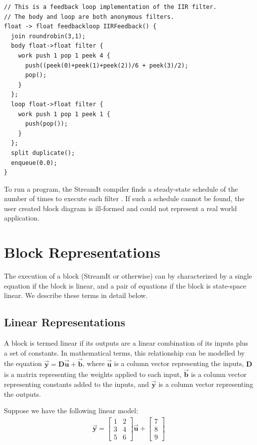 \begin{scriptsize}
\begin{verbatim}
// This is a feedback loop implementation of the IIR filter.
// The body and loop are both anonymous filters.
float -> float feedbackloop IIRFeedback() {
  join roundrobin(3,1);
  body float->float filter {
    work push 1 pop 1 peek 4 {
      push((peek(0)+peek(1)+peek(2))/6 + peek(3)/2);
      pop();
    }
  };
  loop float->float filter {
    work push 1 pop 1 peek 1 {
      push(pop());
    }
  };
  split duplicate();
  enqueue(0.0);
}
\end{verbatim}
\end{scriptsize}

    To run a program, the StreamIt compiler finds a
steady-state schedule of the number of times to execute each
filter \cite{Karczmarek}. If such a schedule cannot be found, the
user created block diagram is ill-formed and could not represent a
real world application.

\section{Block Representations}

    The execution of a block (StreamIt or otherwise) can by
characterized by a single equation if the block is linear, and a
pair of equations if the block is state-space linear. We describe
these terms in detail below.

\subsection{Linear Representations}

    A block is termed linear if its outputs are a linear
combination of its inputs plus a set of constants. In mathematical
terms, this relationship can be modelled by the equation
$\vec{\mathbf{y}} = \mathbf{D}\vec{\mathbf{u}} +
\vec{\mathbf{b}}$, where $\vec{\mathbf{u}}$ is a column vector
representing the inputs, $\mathbf{D}$ is a matrix representing the
weights applied to each input, $\vec{\mathbf{b}}$ is a column
vector representing constants added to the inputs, and
$\vec{\mathbf{y}}$ is a column vector representing the outputs.

    Suppose we have the following linear model:
\begin{eqnarray*}
\vec{\mathbf{y}} = \left [ \begin{array} {cc} 1 & 2 \\ 3 & 4 \\
5 & 6 \end{array} \right ] \vec{\mathbf{u}} + \left [
\begin{array} {c} 7
\\ 8 \\ 9 \end{array}\right ]
\end{eqnarray*}

